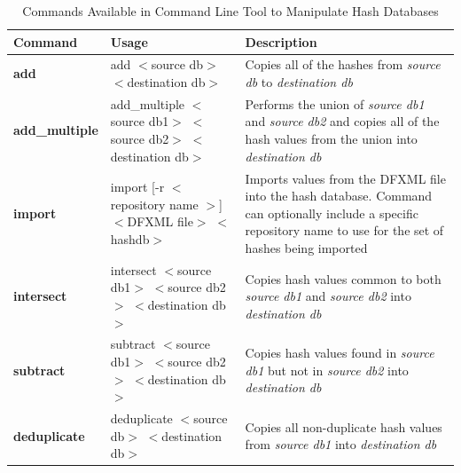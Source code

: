 \documentclass[11pt,fleqn]{article} %
\begin{document}
\begin{table}[!ht]
\centering
\caption{Commands Available in \hash Command Line Tool to Manipulate Hash Databases}
\label{tab:databaseManipulation}
\begin{tabular}{|p{3.5 cm}|p{6 cm}|p{4 cm}|}
\hline \hline
\textbf{Command} & \textbf{Usage} & \textbf{Description} \\
\hline
\textbf{add} & add $<$source db$>$ $<$destination db$>$ & Copies all of the hashes from \textit{source db} to \textit{destination db}\\
\hline
\textbf{add\_multiple} &  add\_multiple $<$source db1$>$ $<$source db2$>$ $<$destination db$>$ & Performs the union of \textit{source db1} and \textit{source db2} and copies all of the hash values from the union into \textit{destination db}\\
\hline
\textbf{import} & import [-r $<$ repository name $>$] $<$DFXML file$>$ $<$hashdb$>$& Imports values from the DFXML file into the hash database. Command can optionally include a specific repository name to use for the set of hashes being imported\\
\hline
\textbf{intersect} & intersect $<$source db1$>$ $<$source db2$>$ $<$destination db$>$&   Copies hash values common to both \textit{source db1} and \textit{source db2} into \textit{destination db}\\
\hline
\textbf{subtract} & subtract $<$source db1$>$ $<$source db2$>$ $<$destination db$>$&   Copies hash values found in \textit{source db1} but not in \textit{source db2} into \textit{destination db}\\
\hline
\textbf{deduplicate} & deduplicate $<$source db$>$ $<$destination db$>$&   Copies all non-duplicate hash values from \textit{source db1} into \textit{destination db}\\
\hline
\end{tabular}
\end{table}
\end{document}
